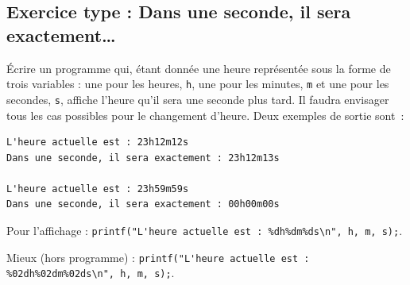 \subsection{Exercice type : Dans une seconde, il sera exactement\ldots}

Écrire un programme qui, étant donnée une heure représentée
sous la forme de trois variables : une pour les heures, \verb|h|, une pour
les minutes,
\verb|m| et une pour les secondes, \verb|s|, affiche l'heure qu'il sera une
seconde plus tard. Il faudra envisager tous les
cas possibles pour le changement d'heure. Deux exemples de sortie sont~:

\begin{verbatim}
L'heure actuelle est : 23h12m12s
Dans une seconde, il sera exactement : 23h12m13s

L'heure actuelle est : 23h59m59s
Dans une seconde, il sera exactement : 00h00m00s
\end{verbatim}

Pour l'affichage :  
\verb|printf("L'heure actuelle est : %dh%dm%ds\n", h, m, s);|.

\begin{correction}
Mieux (hors programme) :
  \verb|printf("L'heure actuelle est : %02dh%02dm%02ds\n", h, m, s);|.
\end{correction}

